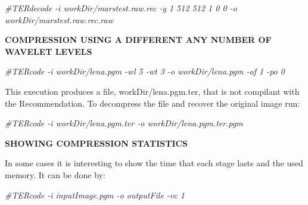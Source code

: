 \documentclass[a4paper,10pt]{article}
\begin{document}
\emph{\#TERdecode -i workDir/marstest.raw.rec -g 1 512 512 1 0 0 -o
workDir/marstest.raw.rec.raw}

\vspace{0.25cm}\textbf{COMPRESSION USING A DIFFERENT ANY NUMBER OF
  WAVELET LEVELS}\vspace{0.25cm}  

\emph{\#TERcode -i workDir/lena.pgm -wl 5 -wt 3 -o
  workDir/lena.pgm -of 1 -po 0}

This execution produces a file,  workDir/lena.pgm.ter,
that is not compilant with the Recommendation.
To decompress the file and recover the original image run:

\emph{\#TERcode -i workDir/lena.pgm.ter -o
  workDir/lena.pgm.ter.pgm}

\vspace{0.25cm}\textbf{SHOWING COMPRESSION
  STATISTICS}\vspace{0.25cm} 

In some cases it is interesting to show the time that each stage
lasts and the used memory. It can be done by: 

\emph{\#TERcode -i inputImage.pgm -o outputFile -vc 1} \\ 
\end{document}
